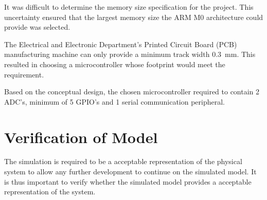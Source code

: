 \documentclass[a4paper,12pt]{article}
\begin{document}
	It was difficult to determine the memory size specification for the project. This uncertainty ensured that the largest memory size the ARM M0 architecture could provide was selected.
	
	The Electrical and Electronic Department's Printed Circuit Board (PCB) manufacturing machine can only provide a  minimum track width \SI{0.3}{mm}. This resulted in choosing a microcontroller whose footprint would meet the requirement.
	
	Based on the conceptual design, the chosen microcontroller required to contain 2 ADC's, minimum of 5 GPIO's and 1 serial communication peripheral.
	
	
	
	
	
	\section{Verification of Model}
	
	The simulation is required to be a acceptable representation of the physical system to allow any further development to continue on the simulated model. It is thus important to verify whether the simulated model provides a acceptable representation of the system.
	
	
	
	

	\newpage
	
	
	
\end{document}
